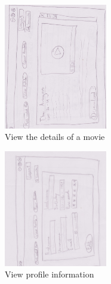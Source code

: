 \begin{figure}[!ht]
  \centering
    \includegraphics[angle=90, width=0.4\textwidth]{Parts/Appendix/Images/PaperMockup/ViewMovie}
  \caption{View the details of a movie}
  \label{fig:Appendix_GUI_sketches_ViewMovie}
\end{figure}
\begin{figure}[!ht]
  \centering
    \includegraphics[angle=90, width=0.4\textwidth]{Parts/Appendix/Images/PaperMockup/ViewProfile}
  \caption{View profile information}
  \label{fig:Appendix_GUI_sketches_ViewProfile}
\end{figure}

